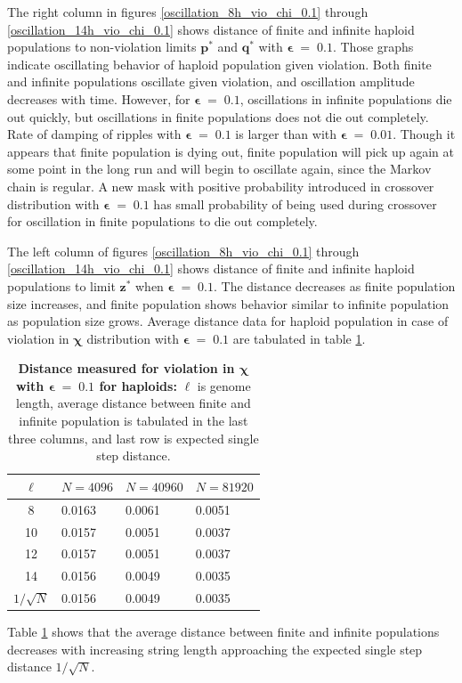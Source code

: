 \clearpage
The right column in figures \ref{oscillation_8h_vio_chi_0.1} through \ref{oscillation_14h_vio_chi_0.1} 
shows distance of finite and infinite haploid populations to non-violation limits $\bm{p^\ast}$ and $\bm{q^\ast}$ with $\bm{\epsilon} \;=\; 0.1$. 
Those graphs indicate oscillating behavior of haploid population given violation. 
Both finite and infinite populations oscillate given violation, and oscillation amplitude decreases with time. 
However, for $\bm{\epsilon} \;=\; 0.1$, oscillations in infinite populations die out quickly, 
but oscillations in finite populations does not die out completely. Rate of damping of ripples with $\bm{\epsilon} \;=\; 0.1$ is  
larger than with $\bm{\epsilon} \;=\; 0.01$. Though it appears that finite population is dying out, 
finite population will pick up again at some point in the long run and will begin to oscillate again, since the Markov chain is regular. 
A new mask with positive probability introduced in crossover distribution with $\bm{\epsilon} \;=\; 0.1$ has small  
probability of being used during crossover for oscillation in finite populations to die out completely. 

The left column of figures \ref{oscillation_8h_vio_chi_0.1} through \ref{oscillation_14h_vio_chi_0.1} 
shows distance of finite and infinite haploid populations to limit $\bm{z^\ast}$ 
when $\bm{\epsilon} \;=\; 0.1$. 
The distance decreases as finite population size increases, 
and finite population shows behavior similar to infinite population as population size grows. 
Average distance data for haploid population in case of violation in $\bm{\chi}$ distribution 
with $\bm{\epsilon} \;=\; 0.1$ are tabulated in table \ref{distanceChiHapEps0.1}.

\begin{table}[h]
\caption[\textbf{Distance measured for violation in $\bm{\chi}$ with $\bm{\epsilon} \;=\; 0.1$  for haploids}]{\textbf{Distance measured for violation in $\bm{\chi}$ with $\bm{\epsilon} \;=\; 0.1$  for haploids:} $\ell$ is genome length, 
average distance between finite and infinite population is tabulated in the last three columns, and last row is expected single step distance.}
\centering
\begin{tabularx}{0.75\textwidth}{ c *{3}{X}}
\toprule
$\ell$ & $N = 4096$ & $N = 40960$ & $N = 81920$  \\
\midrule
8 & 0.0163	& 0.0061 	& 0.0051 \\
10 & 0.0157	&  0.0051	& 0.0037 \\	
12 & 0.0157	&  0.0051	& 0.0037 \\	
14 & 0.0156	&  0.0049	& 0.0035 \\
\midrule
$1/\sqrt{N}$ & 0.0156 & 0.0049 & 0.0035 \\
\bottomrule
\end{tabularx}
\label{distanceChiHapEps0.1}
\end{table} 
Table \ref{distanceChiHapEps0.1} shows that the average distance 
between finite and infinite populations decreases with increasing string length 
approaching the expected single step distance $1/\sqrt{N}$. 

